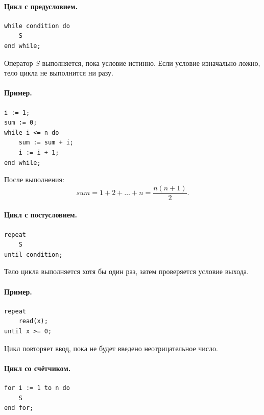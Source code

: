 \documentclass[12pt,a4paper]{article}
\begin{document}
\paragraph{Цикл с предусловием.}

\begin{verbatim}
while condition do
    S
end while;
\end{verbatim}

Оператор $S$ выполняется, пока условие истинно. Если условие изначально ложно, тело цикла не выполнится ни разу.

\paragraph{Пример.}

\begin{verbatim}
i := 1;
sum := 0;
while i <= n do
    sum := sum + i;
    i := i + 1;
end while;
\end{verbatim}

После выполнения:
\[
    sum = 1 + 2 + \dots + n = \frac{n(n+1)}{2}.
\]

\paragraph{Цикл с постусловием.}

\begin{verbatim}
repeat
    S
until condition;
\end{verbatim}

Тело цикла выполняется хотя бы один раз, затем проверяется условие выхода.

\paragraph{Пример.}

\begin{verbatim}
repeat
    read(x);
until x >= 0;
\end{verbatim}

Цикл повторяет ввод, пока не будет введено неотрицательное число.

\paragraph{Цикл со счётчиком.}

\begin{verbatim}
for i := 1 to n do
    S
end for;
\end{verbatim}
\end{document}
